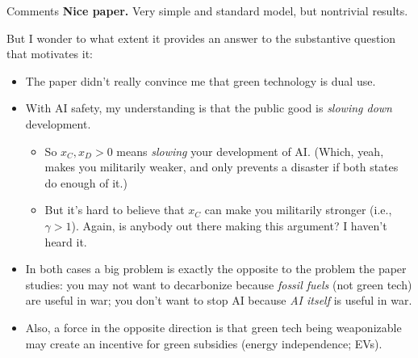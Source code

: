 \documentclass[ignorenonframetext,c,12pt]{beamer}
\providecommand{\tightlist}{%
  \setlength{\itemsep}{0pt}\setlength{\parskip}{0pt}}
\begin{document}
\begin{frame}{Comments}\vspace{0.5em}
  \textbf{Nice paper.} Very simple and standard model, but nontrivial results.

  But I wonder to what extent it provides an answer to the substantive question that motivates it:
  \begin{itemize}\tightlist\vspace{-0.5em}
    \item The paper didn't really convince me that green technology is dual use.
    \item With AI safety, my understanding is that the public good is \textit{slowing down} development.
    \begin{itemize}
      \item So $x_C, x_D > 0$ means \textit{slowing} your development of AI. (Which, yeah, makes you militarily weaker, and only prevents a disaster if both states do enough of it.)
      \item But it's hard to believe that $x_C$ can make you militarily stronger (i.e., $\gamma > 1$). Again, is anybody out there making this argument? I haven't heard it.
  \end{itemize}
  \item In both cases a big problem is exactly the opposite to the problem the paper studies: you may not want to decarbonize because \textit{fossil fuels} (not green tech) are useful in war; you don't want to stop AI because \textit{AI itself} is useful in war.
  \item Also, a force in the opposite direction is that green tech being weaponizable may create an incentive for green subsidies (energy independence; EVs).
  \end{itemize}
\end{frame}
\end{document}

